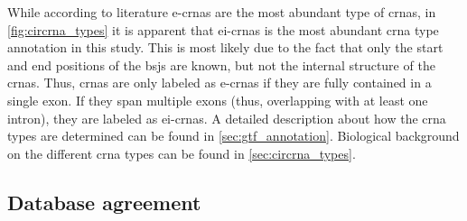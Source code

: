 While according to literature \glspl{e-crna} are the most abundant type of
\glspl{crna}, in \cref{fig:circrna_types} it is apparent that \glspl{ei-crna}
is the most abundant \gls{crna} type annotation in this study.
This is most likely due to the fact that only the start and end positions of
the \glspl{bsj} are known, but not the internal structure of the \glspl{crna}.
Thus, \glspl{crna} are only labeled as \glspl{e-crna} if they are fully
contained in a single exon.
If they span multiple exons (thus, overlapping with at least one intron), they
are labeled as \glspl{ei-crna}.
A detailed description about how the \gls{crna} types are determined can be
found in \cref{sec:gtf_annotation}.
Biological background on the different \gls{crna} types can be found in
\cref{sec:circrna_types}.

\subsection{Database agreement}
